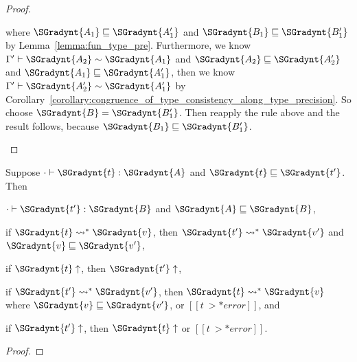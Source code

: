 \begin{proof}
\begin{itemize}
    where $ \SGradynt{A_{{\mathrm{1}}}}  \sqsubseteq  \SGradynt{A'_{{\mathrm{1}}}} $ and $ \SGradynt{B_{{\mathrm{1}}}}  \sqsubseteq  \SGradynt{B'_{{\mathrm{1}}}} $ by Lemma~\ref{lemma:fun_type_pre}.
    Furthermore, we know $ \Gamma'  \vdash  \SGradynt{A_{{\mathrm{2}}}}  \sim  \SGradynt{A_{{\mathrm{1}}}} $ and $ \SGradynt{A_{{\mathrm{2}}}}  \sqsubseteq  \SGradynt{A'_{{\mathrm{2}}}} $ and $ \SGradynt{A_{{\mathrm{1}}}}  \sqsubseteq  \SGradynt{A'_{{\mathrm{1}}}} $, then
    we know $ \Gamma'  \vdash  \SGradynt{A'_{{\mathrm{2}}}}  \sim  \SGradynt{A'_{{\mathrm{1}}}} $ by Corollary~\ref{corollary:congruence_of_type_consistency_along_type_precision}.
    So choose $\SGradynt{B} = \SGradynt{B'_{{\mathrm{1}}}}$. Then reapply the rule above and the result follows, because
    $ \SGradynt{B_{{\mathrm{1}}}}  \sqsubseteq  \SGradynt{B'_{{\mathrm{1}}}} $.
  \end{itemize}
\end{proof}

\begin{theorem}
  \label{thm:gradual_guarantee}
  Suppose $  \cdot   \vdash  \SGradynt{t}  :  \SGradynt{A} $ and $ \SGradynt{t}  \sqsubseteq  \SGradynt{t'} $.  Then
  \begin{enumR}
  \item $  \cdot   \vdash  \SGradynt{t'}  :  \SGradynt{B} $ and $ \SGradynt{A}  \sqsubseteq  \SGradynt{B} $,
  \item if $ \SGradynt{t}  \rightsquigarrow^*  \SGradynt{v} $, then $ \SGradynt{t'}  \rightsquigarrow^*  \SGradynt{v'} $ and $ \SGradynt{v}  \sqsubseteq  \SGradynt{v'} $,
  \item if $ \SGradynt{t}  \uparrow $, then $ \SGradynt{t'}  \uparrow $,
  \item if $ \SGradynt{t'}  \rightsquigarrow^*  \SGradynt{v'} $, then $ \SGradynt{t}  \rightsquigarrow^*  \SGradynt{v} $ where $ \SGradynt{v}  \sqsubseteq  \SGradynt{v'} $, or $[[t ~>* error]]$, and
  \item if $ \SGradynt{t'}  \uparrow $, then $ \SGradynt{t}  \uparrow $ or $[[t ~>* error]]$.
  \end{enumR}
\end{theorem}
\begin{proof}
  
\end{proof}

